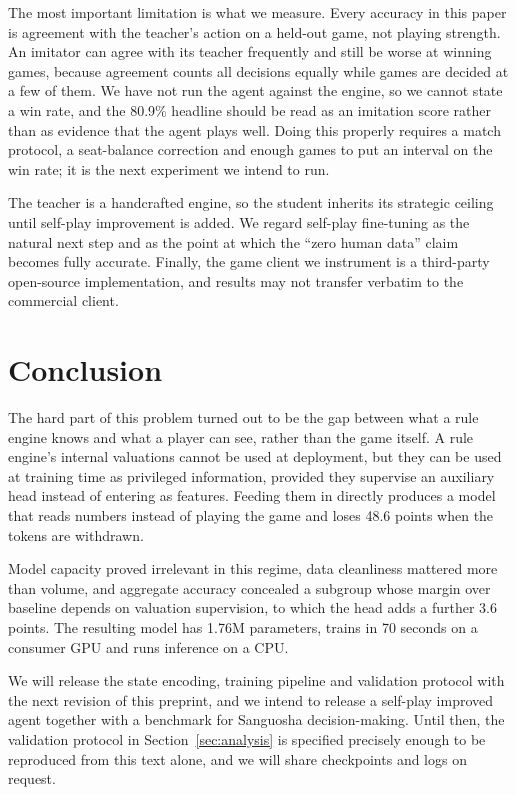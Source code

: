 \documentclass[11pt]{article}
\begin{document}
The most important limitation is what we measure. Every accuracy in this paper is agreement
with the teacher's action on a held-out game, not playing strength. An imitator can agree
with its teacher frequently and still be worse at winning games, because agreement counts all
decisions equally while games are decided at a few of them. We have not run the agent against
the engine, so we cannot state a win rate, and the 80.9\% headline should be read as an
imitation score rather than as evidence that the agent plays well. Doing this properly
requires a match protocol, a seat-balance correction and enough games to put an interval on
the win rate; it is the next experiment we intend to run.

The teacher is a handcrafted engine, so the student inherits its strategic ceiling until
self-play improvement is added. We regard self-play fine-tuning as the natural next step and
as the point at which the ``zero human data'' claim becomes fully accurate. Finally, the
game client we instrument is a third-party open-source implementation, and results may not
transfer verbatim to the commercial client.

\section{Conclusion}

The hard part of this problem turned out to be the gap between what a rule engine knows and
what a player can see, rather than the game itself. A rule engine's internal valuations
cannot be used at deployment, but they can be used at training time as privileged
information, provided they supervise an auxiliary head instead of entering as features.
Feeding them in directly produces a model that reads numbers instead of playing the game and
loses 48.6 points when the tokens are withdrawn.

Model capacity proved irrelevant in this regime, data cleanliness mattered more than volume,
and aggregate accuracy concealed a subgroup whose margin over baseline depends on valuation
supervision, to which the head adds a further 3.6 points. The resulting model has 1.76M
parameters, trains in 70 seconds on a consumer GPU and runs inference on a CPU.

We will release the state encoding, training pipeline and validation protocol with the next
revision of this preprint, and we intend to release a self-play improved agent together with
a benchmark for Sanguosha decision-making. Until then, the validation protocol in
Section~\ref{sec:analysis} is specified precisely enough to be reproduced from this text
alone, and we will share checkpoints and logs on request.
\end{document}
